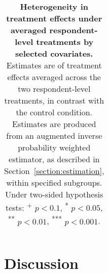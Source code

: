 \documentclass[letterpaper, 12pt, parskip=full,DIV=10]{scrartcl}
\begin{document}
\begin{table}[H]
{\begin{tabular}{lccccccc}
    \end{tabular}
   }
   \caption{\textbf{Heterogeneity in treatment effects under averaged respondent-level treatments by selected covariates.} Estimates are of treatment effects averaged across the two respondent-level treatments, in contrast with the control condition. Estimates are produced from an augmented inverse probability weighted estimator, as described in Section~\ref{section:estimation}, within specified subgroups. Under two-sided hypothesis tests: \textsuperscript{+} $p<0.1$, \textsuperscript{*} $p < 0.05$, \textsuperscript{**} $p < 0.01$, \textsuperscript{***} $p < 0.001$.}
  \label{tab:heterogeneity_treatment}
\end{table}









\section{Discussion}
\end{document}
